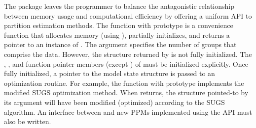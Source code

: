 \documentclass[article, nojss]{jss}
\begin{document}
The  package leaves the programmer to balance the antagonistic relationship between memory usage and computational efficiency by offering a uniform API to partition estimation methods. The  function with prototype  is a convenience function that allocates memory (using ), partially initializes, and returns a pointer to an instance of . The argument  specifies the number of groups that comprise the data. However, the structure returned by  is not fully initialized. The , ,  and function pointer members (except ) of  must be initialized explicitly. Once fully initialized, a pointer to the model state structure is passed to an optimization routine. For example, the function with prototype  implements the modified SUGS optimization method. When  returns, the structure pointed-to by its argument will have been modified (optimized) according to the SUGS algorithm. An interface between  and new PPMs implemented using the   API must also be written.


\end{document}
